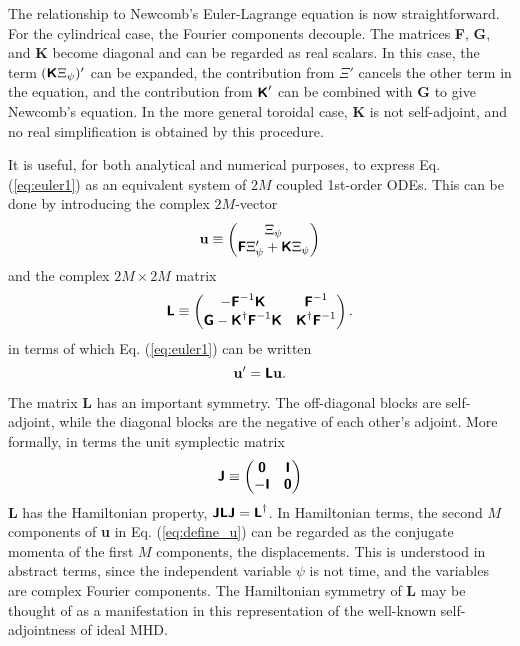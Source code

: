 \documentclass[prb,twocolumn,showpacs,preprintnumbers,amsmath,amssymb]{revtex4}
\renewcommand*{\v}[1]{\hbox{\bfseries #1}}
\renewcommand*{\t}[1]{\hbox{\sffamily\bfseries #1}}
\begin{document}
The relationship to Newcomb's Euler-Lagrange equation is now
straightforward.  For the cylindrical case, the Fourier components
decouple.  The matrices \t{F}, \t{G}, and \t{K} become diagonal and can
be regarded as real scalars.  In this case, the term $(\t{K} \Xi_\psi)'$
can be expanded, the contribution from $\Xi'$ cancels the other term in
the equation, and the contribution from $\t{K}'$ can be combined with
\t{G} to give Newcomb's equation.  In the more general toroidal case,
\t{K} is not self-adjoint, and no real simplification is obtained by
this procedure.

It is useful, for both analytical and numerical purposes, to express
Eq. (\ref{eq:euler1}) as an equivalent system of $2M$ coupled 1st-order
ODEs.  This can be done by introducing the complex $2M$-vector
\begin{equation}
\v{u} \equiv \left( \begin{matrix} \Xi_\psi \\ \t{F} \Xi_\psi' + \t{K}
\Xi_\psi \end{matrix} \right)
\label{eq:define_u}
\end{equation}
and the complex $2M \times 2M$ matrix
\begin{equation}
\t{L} \equiv \left( \begin{matrix}
- \t{F}^{-1} \t{K} & \t{F}^{-1} \\
\t{G} - \t{K}^\dagger \t{F}^{-1} \t{K} & \t{K}^\dagger \t{F}^{-1}
\end{matrix} \right). 
\label{eq:define_L}
\end{equation}
in terms of which Eq. (\ref{eq:euler1}) can be written
\begin{equation}
\v{u}' = \t{L} \v{u}.
\label{eq:euler2}
\end{equation}

The matrix \t{L} has an important symmetry.  The off-diagonal blocks are
self-adjoint, while the diagonal blocks are the negative of each other's
adjoint.  More formally, in terms the unit symplectic matrix
\[
\t{J} \equiv \left( \begin{matrix}
\t{0} & \t{I} \\ -\t{I} & \t{0} \end{matrix} \right)
\]
\t{L} has the Hamiltonian property, $\t{J} \t{L} \t{J} = \t{L}^\dagger$.
In Hamiltonian terms, the second $M$ components of \v{u} in
Eq. (\ref{eq:define_u}) can be regarded as the conjugate momenta of the
first $M$ components, the displacements.  This is understood in abstract
terms, since the independent variable $\psi$ is not time, and the
variables are complex Fourier components.  The Hamiltonian symmetry of
\t{L} may be thought of as a manifestation in this representation of the
well-known self-adjointness of ideal MHD.
\end{document}
